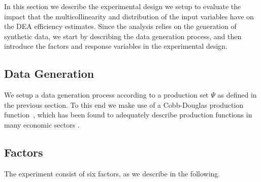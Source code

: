 
In this section we describe the experimental design we setup to evaluate the impact that the multicollinearity and distribution of the input variables have on the DEA efficiency estimates. 
Since the analysis relies on the generation of synthetic data, 
we start by describing the data generation process, 
and then introduce the factors and response variables in the experimental design. 

\subsection{Data Generation}
We setup a data generation process according to a production set $\Psi$ as defined  in the previous section. 
To this end we make use of a Cobb-Douglas production function~\cite{Douglas1997}, 
which has been found to adequately describe production functions in many economic sectors
. 



\subsection{Factors}
The experiment consist of six factors, as we describe in the following. 




